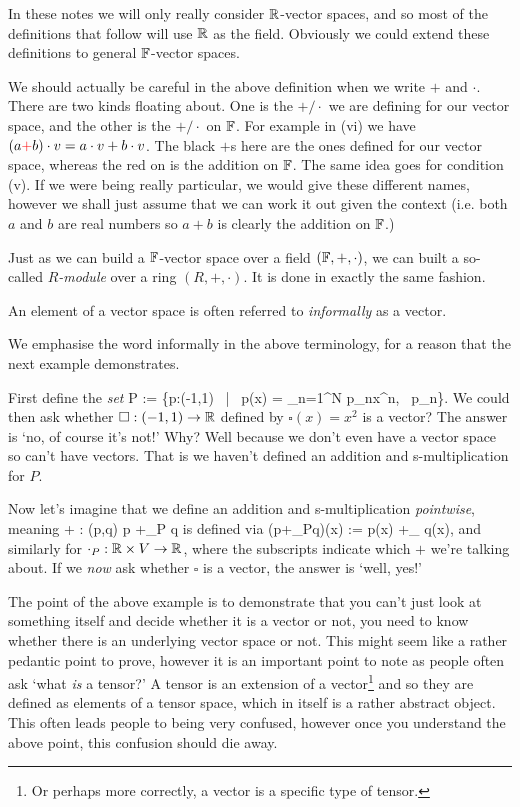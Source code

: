 In these notes we will only really consider $\mathbb{R}$-vector spaces, and so most of the definitions that follow will use $\mathbb{R}$ as the field. Obviously we could extend these definitions to general $\mathbb{F}$-vector spaces. 

\br 
    We should actually be careful in the above definition when we write $+$ and $\cdot$. There are two kinds floating about. One is the $+/\cdot$ we are defining for our vector space, and the other is the $+/\cdot$ on $\mathbb{F}$. For example in (vi) we have $(a \textcolor{red}{+} b) \cdot v = a\cdot v + b \cdot v$. The black $+$s here are the ones defined for our vector space, whereas the red on is the addition on $\mathbb{F}$. The same idea goes for condition (v). If we were being really particular, we would give these different names, however we shall just assume that we can work it out given the context (i.e. both $a$ and $b$ are real numbers so $a+b$ is clearly the addition on $\mathbb{F}$.)
\er

\br 
    Just as we can build a $\mathbb{F}$-vector space over a field $(\mathbb{F},+,\cdot)$, we can built a so-called \textit{$R$-module} over a ring $(R,+,\cdot)$. It is done in exactly the same fashion. 
\er 

\bter 
    An element of a vector space is often referred to \textit{informally} as a vector.  
\eter 

We emphasise the word informally in the above terminology, for a reason that the next example demonstrates.

\bex
\label{ex:PolynomialExample}
    First define the \textit{set} 
    \bse 
        P := \bigg\{p:(-1,1) \to \R \, \bigg| \, p(x) = \sum_{n=1}^N p_nx^n, \, p_n\in\R\bigg\}. 
    \ese 
    We could then ask whether $\square:(-1,1) \to \mathbb{R}$ defined by $\square(x) = x^2$ is a vector? The answer is `no, of course it's not!' Why? Well because we don't even have a vector space so can't have vectors. That is we haven't defined an addition and s-multiplication for $P$. 
    
    Now let's imagine that we define an addition and s-multiplication \textit{pointwise}, meaning 
    \bse 
        + : (p,q) \mapsto p +_P q
    \ese 
    is defined via 
    \bse 
        (p+_Pq)(x) := p(x) +_{\R} q(x),
    \ese
    and similarly for $\cdot_P:\mathbb{R}\times V\to \mathbb{R}$, where the subscripts indicate which $+$ we're talking about. If we \textit{now} ask whether $\square$ is a vector, the answer is `well, yes!'
\eex 

The point of the above example is to demonstrate that you can't just look at something itself and decide whether it is a vector or not, you need to know whether there is an underlying vector space or not. This might seem like a rather pedantic point to prove, however it is an important point to note as people often ask `what \textit{is} a tensor?' A tensor is an extension of a vector\footnote{Or perhaps more correctly, a vector is a specific type of tensor.} and so they are defined as elements of a tensor space, which in itself is a rather abstract object. This often leads people to being very confused, however once you understand the above point, this confusion should die away. 

